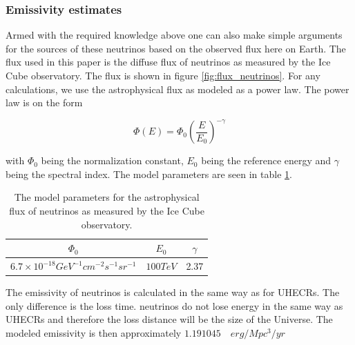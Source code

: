 \documentclass{article}
\begin{document}
\subsubsection{Emissivity estimates}
\label{sec:emmisivity_neutrinos}

Armed with the required knowledge above one can also make simple arguments for the sources of these neutrinos based on the observed 
flux here on Earth. The flux used in this paper is the diffuse flux of neutrinos as measured by the Ice Cube observatory. The flux is shown in figure \ref{fig:flux_neutrinos}. 
For any calculations, we use the astrophysical flux as modeled as a power law. The power law is on the form 

\begin{equation}
    \Phi(E) = \Phi_0 \left(\frac{E}{E_0}\right)^{-\gamma}
\end{equation}

with $\Phi_0$ being the normalization constant, $E_0$ being the reference energy and $\gamma$ being the spectral index. The model parameters are seen in table \ref{tab:neutrino_flux}.

\begin{table}
    \centering
    \begin{tabular}{|c|c|c|}
        \hline
        $\Phi_0$ & $E_0$ & $\gamma$ \\
        \hline
        $6.7\times 10^{-18} GeV^{-1} cm^{-2} s^{-1} sr^{-1}$ & $100 TeV$ & 2.37 \\
        \hline
    \end{tabular}
    \caption{The model parameters for the astrophysical flux of neutrinos as measured by the Ice Cube observatory.}
    \label{tab:neutrino_flux}
\end{table}

The emissivity of neutrinos is calculated in the same way as for UHECRs. The only difference is the loss time. neutrinos do not lose energy in the same way as UHECRs and therefore the loss distance will be the size of the Universe. 
The modeled emissivity is then approximately $1.19 10{45} \quad erg/Mpc^3/yr$
\end{document}
